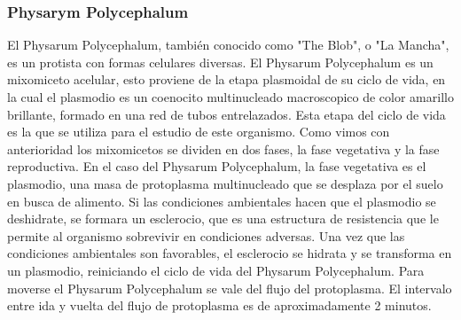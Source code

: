 \subsubsection{Physarym Polycephalum}
    El Physarum Polycephalum, tambi\'en conocido como "The Blob", 
        o "La Mancha", es un protista con formas celulares diversas. El Physarum Polycephalum
        es un mixomiceto acelular, esto proviene de la etapa plasmoidal de su ciclo de vida,
        en la cual el plasmodio es un coenocito multinucleado macroscopico de color amarillo 
        brillante, formado en una red de tubos entrelazados. Esta etapa del ciclo de vida es 
        la que se utiliza para el estudio de este organismo.\cite{Dee1960}
    \vskip 0.5cm
    Como vimos con anterioridad los mixomicetos se dividen en dos fases, la fase vegetativa 
        y la fase reproductiva. En el caso del Physarum Polycephalum, la fase vegetativa
        es el plasmodio, una masa de protoplasma multinucleado que se desplaza por el suelo
        en busca de alimento. Si las condiciones ambientales hacen que el plasmodio se deshidrate,
        se formara un esclerocio, que es una estructura de resistencia que le permite al
        organismo sobrevivir en condiciones adversas. Una vez que las condiciones ambientales
        son favorables, el esclerocio se hidrata y se transforma en un plasmodio, reiniciando
        el ciclo de vida del Physarum Polycephalum.\cite{Dee1960}
    \vskip 0.5cm
    Para moverse el Physarum Polycephalum se vale del flujo del protoplasma. El intervalo entre ida y vuelta
        del flujo de protoplasma es de aproximadamente 2 minutos.\cite{Dee1960}
